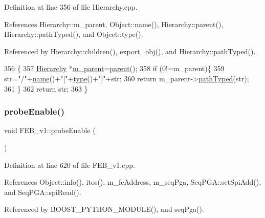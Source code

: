 Definition at line 356 of file Hierarchy.\+cpp.



References Hierarchy\+::m\+\_\+parent, Object\+::name(), Hierarchy\+::parent(), Hierarchy\+::path\+Typed(), and Object\+::type().



Referenced by Hierarchy\+::children(), export\+\_\+obj(), and Hierarchy\+::path\+Typed().


\begin{DoxyCode}
356                                            \{
357   \hyperlink{classHierarchy}{Hierarchy} *\hyperlink{classHierarchy_a5814bb280d4e8539ab25ab6cbfb9cc4f}{m\_parent}=\hyperlink{classHierarchy_a1c7bec8257e717f9c1465e06ebf845fc}{parent}();
358   \textcolor{keywordflow}{if} (0!=m\_parent)\{
359     str=\textcolor{stringliteral}{"/"}+\hyperlink{classObject_a300f4c05dd468c7bb8b3c968868443c1}{name}()+\textcolor{stringliteral}{"["}+\hyperlink{classObject_a84f99f70f144a83e1582d1d0f84e4e62}{type}()+\textcolor{stringliteral}{"]"}+str;
360     \textcolor{keywordflow}{return} m\_parent->\hyperlink{classHierarchy_a1efd56cd164d328d2002e53a10a19b8c}{pathTyped}(str);
361   \}
362   \textcolor{keywordflow}{return} str;
363 \}
\end{DoxyCode}
\mbox{\label{classFEB__v1_aa9a047f616c6affac88a8d9ec984013f}} 
\subsubsection{\texorpdfstring{probe\+Enable()}{probeEnable()}}
{\footnotesize\ttfamily void F\+E\+B\+\_\+v1\+::probe\+Enable (\begin{DoxyParamCaption}{ }\end{DoxyParamCaption})}



Definition at line 620 of file F\+E\+B\+\_\+v1.\+cpp.



References Object\+::info(), itos(), m\+\_\+fe\+Address, m\+\_\+seq\+Pga, Seq\+P\+G\+A\+::set\+Spi\+Add(), and Seq\+P\+G\+A\+::spi\+Read().



Referenced by B\+O\+O\+S\+T\+\_\+\+P\+Y\+T\+H\+O\+N\+\_\+\+M\+O\+D\+U\+L\+E(), and seq\+Pga().


